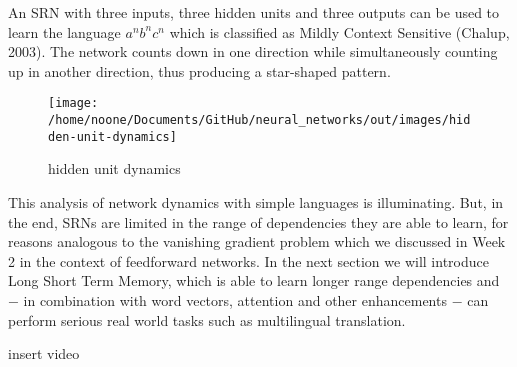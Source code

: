 \documentclass[11pt]{article}
\begin{document}
An SRN with three inputs, three hidden units and three outputs can be used to learn the language $a^n b^n c^n$ which is classified as Mildly Context Sensitive (Chalup, 2003).
The network counts down in one direction while simultaneously counting up in another direction, thus producing a star-shaped pattern.

\begin{figure}[h]
    \centering
    \texttt{[image: /home/noone/Documents/GitHub/neural\_networks/out/images/hidden-unit-dynamics]}
    \caption[hidden unit dynamics]{hidden unit dynamics}
    \label{fig: hidden unit dynamics}
\end{figure}

This analysis of network dynamics with simple languages is illuminating.
But, in the end, SRNs are limited in the range of dependencies they are able to learn, for reasons analogous to the vanishing gradient problem which we discussed in Week 2 in the context of feedforward networks.
In the next section we will introduce Long Short Term Memory, which is able to learn longer range dependencies and $-$ in combination with word vectors, attention and other enhancements $-$ can perform serious real world tasks such as multilingual translation.

insert video
\end{document}
